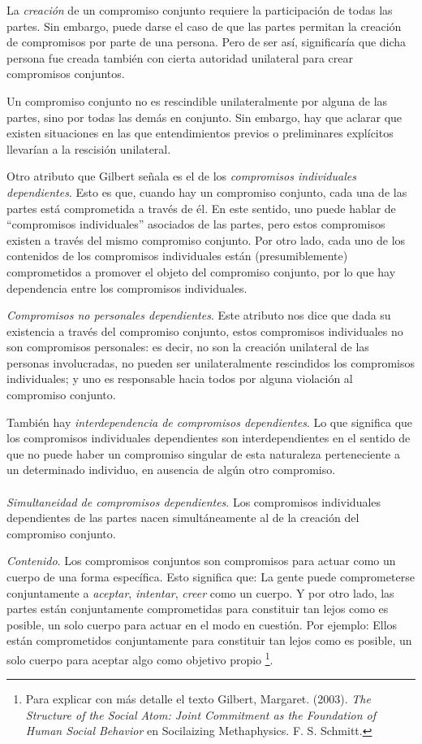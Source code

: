 \documentclass[oneside]{book}
\begin{document}
La \textit{creación} de un compromiso conjunto requiere la participación de todas las partes. Sin embargo, puede darse el caso de que las partes permitan la creación de compromisos por parte de una persona. Pero de ser así, significaría que dicha persona fue creada también con cierta autoridad unilateral para crear compromisos conjuntos.

Un compromiso conjunto no es rescindible unilateralmente por alguna de las partes, sino por todas las demás en conjunto. Sin embargo, hay que aclarar que existen situaciones en las que entendimientos previos o preliminares explícitos llevarían a la rescisión unilateral. 

Otro atributo que Gilbert señala es el de los \textit{compromisos individuales dependientes}. Esto es que, cuando hay un compromiso conjunto, cada una de las partes está comprometida a través de él. En este sentido, uno puede hablar de “compromisos individuales” asociados de las partes, pero estos compromisos existen a través del mismo compromiso conjunto. Por otro lado, cada uno de los contenidos de los compromisos individuales están (presumiblemente) comprometidos a promover el objeto del compromiso conjunto, por lo que hay dependencia entre los compromisos individuales.

\textit{Compromisos no personales dependientes}. Este atributo nos dice que dada su existencia a través del compromiso conjunto, estos compromisos individuales no son compromisos personales: es decir, no son la creación unilateral de las personas involucradas, no pueden ser unilateralmente rescindidos los compromisos individuales; y uno es responsable hacia todos por alguna violación al compromiso conjunto.

También hay \textit{interdependencia de compromisos dependientes}. Lo que significa que los compromisos individuales dependientes son interdependientes en el sentido de que no puede haber un compromiso singular de esta naturaleza perteneciente a un determinado individuo, en ausencia de algún otro compromiso.
\\
\\

\textit{Simultaneidad de compromisos dependientes}. Los compromisos individuales dependientes de las partes nacen simultáneamente al de la creación del compromiso conjunto.

\textit{Contenido}. Los compromisos conjuntos son compromisos para actuar como un cuerpo de una forma específica. Esto significa que: La gente puede comprometerse conjuntamente a \textit{aceptar}, \textit{intentar}, \textit{creer} como un cuerpo. Y por otro lado, las partes están conjuntamente comprometidas para constituir tan lejos como es posible, un solo cuerpo para actuar en el modo en cuestión. Por ejemplo: Ellos están comprometidos conjuntamente para constituir tan lejos como es posible, un solo cuerpo para aceptar algo como objetivo propio \footnote{Para explicar con más detalle el texto Gilbert, Margaret. (2003). \textit{The Structure of the Social Atom: Joint Commitment as the Foundation of Human Social Behavior} en Socilaizing Methaphysics. F. S. Schmitt.}.
\end{document}

